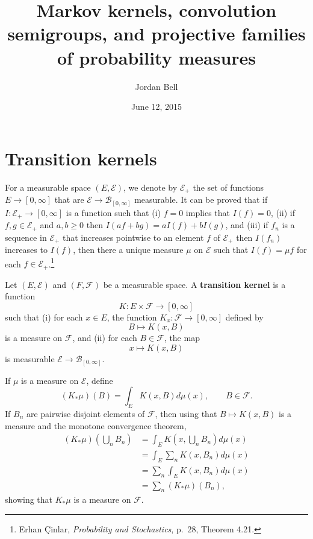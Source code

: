 \documentclass{article}
\theoremstyle{definition}
\theoremstyle{definition}
\begin{document}
\title{Markov kernels, convolution semigroups, and projective families of probability measures}
\author{Jordan Bell}
\date{June 12, 2015}

\maketitle


\section{Transition kernels}
For a measurable space $(E,\mathscr{E})$, we denote by $\mathscr{E}_+$ the set of functions $E \to [0,\infty]$
that are $\mathscr{E} \to \mathscr{B}_{[0,\infty]}$ measurable. 
It can be proved that if $I:\mathscr{E}_+ \to [0,\infty]$ is a function such that
(i) $f=0$ implies that $I(f)=0$, (ii) if $f,g \in \mathscr{E}_+$ and $a,b \geq 0$ then
$I(af+bg)=aI(f)+bI(g)$, and (iii)
if $f_n$ is a sequence in $\mathscr{E}_+$ that increases pointwise to an element $f$ of $\mathscr{E}_+$ then
$I(f_n)$ increases to $I(f)$,
then there a unique measure $\mu$ on $\mathscr{E}$ such that
$I(f)=\mu f$ for each $f \in \mathscr{E}_+$.\footnote{Erhan \c{C}inlar, {\em Probability and Stochastics}, p.~28, Theorem 4.21.}


Let $(E,\mathscr{E})$ and $(F,\mathscr{F})$ be a measurable space. A \textbf{transition kernel} is a function
\[
K:E \times \mathscr{F} \to [0,\infty]
\]
such that 
(i) for each $x \in E$, the function $K_x:\mathscr{F} \to [0,\infty]$ defined by
\[
B \mapsto K(x,B)
\]
is a   measure on $\mathscr{F}$, and (ii)
for each $B \in \mathscr{F}$,   the map
\[
x \mapsto K(x,B)
\]
is measurable $\mathscr{E} \to \mathscr{B}_{[0,\infty]}$.

If $\mu$ is a  measure on $\mathscr{E}$, define
\[
(K_* \mu)(B) = \int_E K(x,B) d\mu(x), \qquad B \in \mathscr{F}.
\]
If $B_n$ are pairwise disjoint elements of $\mathscr{F}$, then using that
$B \mapsto K(x,B)$ is a  measure and the monotone convergence theorem,
\begin{align*}
(K_* \mu)\left(\bigcup_n B_n \right)&=\int_E K\left(x, \bigcup_n B_n \right) d\mu(x)\\
&=\int_E \sum_n K(x,B_n) d\mu(x)\\
&=\sum_n \int_E K(x,B_n) d\mu(x)\\
&=\sum_n (K_* \mu)(B_n),
\end{align*}
showing that $K_*\mu$ is a  measure on $\mathscr{F}$.
\end{document}
